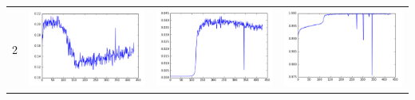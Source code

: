 \documentclass[14pt, a4paper]{extarticle}
\begin{document}
\begin{table}[!htb]
{\begin{tabular}{|c|c|c|c|}
\hline
2 & \includegraphics[scale=0.3]{images/ks_2.png} & \includegraphics[scale=0.3]{images/cvm_2.png} & \includegraphics[scale=0.3]{images/auc_2.png} \\

\end{tabular}}
\end{table}
\end{document}
